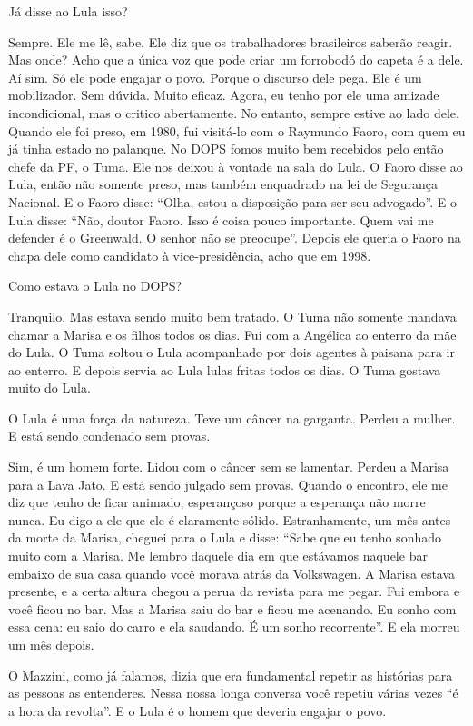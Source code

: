 \falaG Já disse ao Lula isso?

\falaM Sempre. Ele me lê, sabe. Ele diz que os trabalhadores brasileiros
saberão reagir. Mas onde? Acho que a única voz que pode criar um
forrobodó do capeta é a dele. Aí sim. Só ele pode engajar o povo. Porque
o discurso dele pega. Ele é um mobilizador. Sem dúvida. Muito eficaz.
Agora, eu tenho por ele uma amizade incondicional, mas o critico
abertamente. No entanto, sempre estive ao lado dele. Quando ele foi
preso, em 1980, fui visitá-lo com o Raymundo Faoro, com quem eu já tinha
estado no palanque. No DOPS fomos muito bem recebidos pelo então chefe
da PF, o Tuma. Ele nos deixou à vontade na sala do Lula. O Faoro disse
ao Lula, então não somente preso, mas também enquadrado na lei de
Segurança Nacional. E o Faoro disse: ``Olha, estou a disposição para ser
seu advogado''. E o Lula disse: ``Não, doutor Faoro. Isso é coisa pouco
importante. Quem vai me defender é o Greenwald. O senhor não se
preocupe''. Depois ele queria o Faoro na chapa dele como candidato à
vice-presidência, acho que em 1998.

\falaG Como estava o Lula no DOPS?

\falaM Tranquilo. Mas estava sendo muito bem tratado. O Tuma não somente
mandava chamar a Marisa e os filhos todos os dias. Fui com a Angélica ao
enterro da mãe do Lula. O Tuma soltou o Lula acompanhado por dois
agentes à paisana para ir ao enterro. E depois servia ao Lula lulas
fritas todos os dias. O Tuma gostava muito do Lula.

\falaG O Lula é uma força da natureza. Teve um câncer na garganta. Perdeu a
mulher. E está sendo condenado sem provas.

\falaM Sim, é um homem forte. Lidou com o câncer sem se lamentar. Perdeu a
Marisa para a Lava Jato. E está sendo julgado sem provas. Quando o
encontro, ele me diz que tenho de ficar animado, esperançoso porque a
esperança não morre nunca. Eu digo a ele que ele é claramente sólido.
Estranhamente, um mês antes da morte da Marisa, cheguei para o Lula e
disse: ``Sabe que eu tenho sonhado muito com a Marisa. Me lembro daquele
dia em que estávamos naquele bar embaixo de sua casa quando você morava
atrás da Volkswagen. A Marisa estava presente, e a certa altura chegou a
perua da revista para me pegar. Fui embora e você ficou no bar. Mas a
Marisa saiu do bar e ficou me acenando. Eu sonho com essa cena: eu saio
do carro e ela saudando. É um sonho recorrente''. E ela morreu um mês
depois.

\falaG O Mazzini, como já falamos, dizia que era fundamental repetir as
histórias para as pessoas as entenderes. Nessa nossa longa conversa você
repetiu várias vezes ``é a hora da revolta''. E o Lula é o homem que
deveria engajar o povo.

